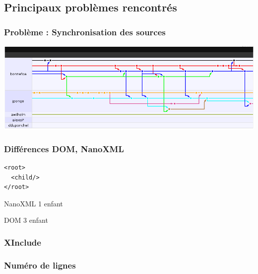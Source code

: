 \subsection{Principaux problèmes rencontrés}
\begin{frame}\frametitle{Problème : Synchronisation des sources}
\includegraphics[width=\linewidth]{../image/gitHubBranche.png}
\end{frame}
\begin{frame}[containsverbatim]\frametitle{Différences DOM, NanoXML}
\begin{centering}
\begin{minipage}[c]{.5\linewidth}
\begin{verbatim}
<root>
  <child/>
</root>
\end{verbatim}
\end{minipage}
\vfill
\begin{minipage}[c]{.4\linewidth}
	\begin{beamerboxesrounded}[shadow=true]{NanoXML}
		1  enfant
	\end{beamerboxesrounded}
\end{minipage}
\hfill
\begin{minipage}[c]{.4\linewidth}
	\begin{beamerboxesrounded}[shadow=true]{DOM}
		3  enfant
	\end{beamerboxesrounded}
\end{minipage}
\vfill
\end{centering}
\end{frame}
\begin{frame}\frametitle{XInclude}
\end{frame}
\begin{frame}\frametitle{Numéro de lignes}
\end{frame}